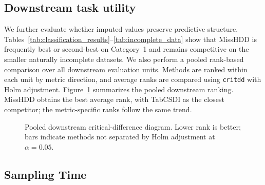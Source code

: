 \documentclass[times, review, 10pt]{elsarticle}
\newcommand{\DIFaddbegin}{\begingroup\color{blue}}
\newcommand{\DIFaddend}{\endgroup}
\begin{document}
\subsection{Downstream task utility}

\DIFaddbegin
We further evaluate whether imputed values preserve predictive structure.
Tables~\ref{tab:classification_results}--\ref{tab:incomplete_data} show that
MissHDD is frequently best or second-best on Category~1 and remains competitive
on the smaller naturally incomplete datasets. We also perform a pooled rank-based comparison over all downstream evaluation
units. Methods are ranked within
each unit by metric direction, and average ranks are compared using
\texttt{critdd} with Holm adjustment. Figure~\ref{fig:cd_downstream} summarizes the pooled downstream ranking.
MissHDD obtains the best average rank, with TabCSDI as the closest competitor;
the metric-specific ranks follow the same trend.
\DIFaddend

\DIFaddbegin
\begin{figure}[!t]
\centering
\resizebox{0.92\textwidth}{!}{}
\caption{Pooled downstream critical-difference diagram. Lower rank is better;
bars indicate methods not separated by Holm adjustment at $\alpha=0.05$.}
\label{fig:cd_downstream}
\end{figure}
\DIFaddend





\subsection{Sampling Time}
\end{document}
